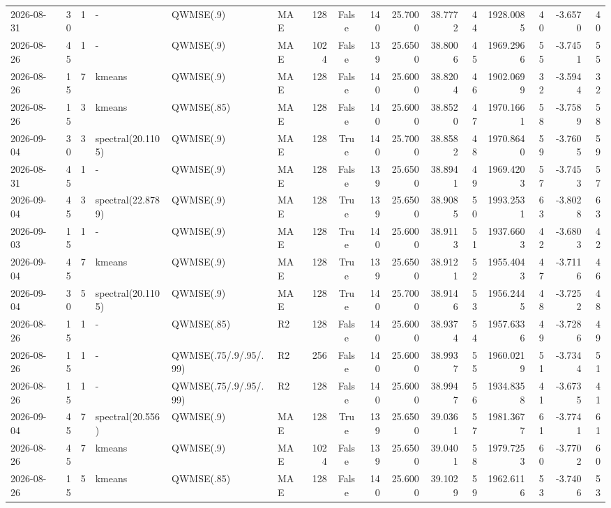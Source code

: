 \documentclass[10pt]{article}
\begin{document}
\begin{landscape}
\begin{longtable}{@{}lrrlllrcrrrrrrrr@{}}
2026-08-31 & 30 & 1 & - & QWMSE(.9) & MAE & 128 & False & 140 & 25.7000 & 38.7772 & 44 & 1928.0085 & 40 & -3.6570 & 40 \\
2026-08-26 & 45 & 1 & - & QWMSE(.9) & MAE & 1024 & False & 139 & 25.6500 & 38.8006 & 45 & 1969.2966 & 55 & -3.7451 & 55 \\
2026-08-26 & 15 & 7 & kmeans & QWMSE(.9) & MAE & 128 & False & 140 & 25.6000 & 38.8204 & 46 & 1902.0699 & 32 & -3.5944 & 32 \\
2026-08-26 & 15 & 3 & kmeans & QWMSE(.85) & MAE & 128 & False & 140 & 25.6000 & 38.8520 & 47 & 1970.1661 & 58 & -3.7589 & 58 \\
2026-09-04 & 30 & 3 & spectral(20.1105) & QWMSE(.9) & MAE & 128 & True & 140 & 25.7000 & 38.8582 & 48 & 1970.8640 & 59 & -3.7605 & 59 \\
2026-08-31 & 45 & 1 & - & QWMSE(.9) & MAE & 128 & False & 139 & 25.6500 & 38.8941 & 49 & 1969.4203 & 57 & -3.7453 & 57 \\
2026-09-04 & 45 & 3 & spectral(22.8789) & QWMSE(.9) & MAE & 128 & True & 139 & 25.6500 & 38.9085 & 50 & 1993.2531 & 63 & -3.8028 & 63 \\
2026-09-03 & 15 & 1 & - & QWMSE(.9) & MAE & 128 & True & 140 & 25.6000 & 38.9113 & 51 & 1937.6603 & 42 & -3.6803 & 42 \\
2026-09-04 & 45 & 7 & kmeans & QWMSE(.9) & MAE & 128 & True & 139 & 25.6500 & 38.9121 & 52 & 1955.4043 & 47 & -3.7116 & 46 \\
2026-09-04 & 30 & 5 & spectral(20.1105) & QWMSE(.9) & MAE & 128 & True & 140 & 25.7000 & 38.9146 & 53 & 1956.2445 & 48 & -3.7252 & 48 \\
2026-08-26 & 15 & 1 & - & QWMSE(.85) & R2 & 128 & False & 140 & 25.6000 & 38.9374 & 54 & 1957.6336 & 49 & -3.7286 & 49 \\
2026-08-26 & 15 & 1 & - & QWMSE(.75/.9/.95/.99) & R2 & 256 & False & 140 & 25.6000 & 38.9937 & 55 & 1960.0219 & 51 & -3.7344 & 51 \\
2026-08-26 & 15 & 1 & - & QWMSE(.75/.9/.95/.99) & R2 & 128 & False & 140 & 25.6000 & 38.9947 & 56 & 1934.8358 & 41 & -3.6735 & 41 \\
2026-09-04 & 45 & 7 & spectral(20.556) & QWMSE(.9) & MAE & 128 & True & 139 & 25.6500 & 39.0361 & 57 & 1981.3677 & 61 & -3.7741 & 61 \\
2026-08-26 & 45 & 7 & kmeans & QWMSE(.9) & MAE & 1024 & False & 139 & 25.6500 & 39.0401 & 58 & 1979.7253 & 60 & -3.7702 & 60 \\
2026-08-26 & 15 & 5 & kmeans & QWMSE(.85) & MAE & 128 & False & 140 & 25.6000 & 39.1029 & 59 & 1962.6116 & 53 & -3.7406 & 53 \\

\end{longtable}
\end{landscape}
\end{document}
